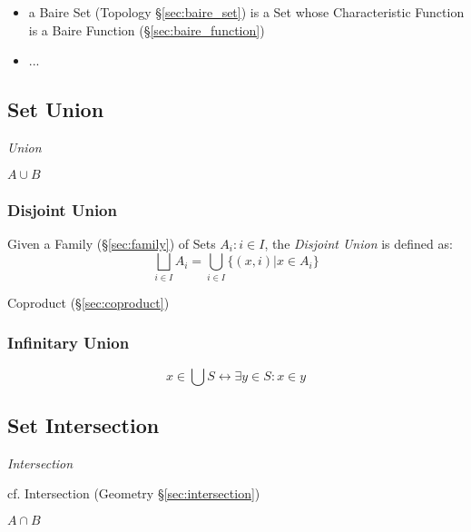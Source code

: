 \begin{itemize}
  \item a Baire Set (Topology \S\ref{sec:baire_set}) is a Set whose
    Characteristic Function is a Baire Function (\S\ref{sec:baire_function})
  \item ...
\end{itemize}



\subsection{Set Union}\label{sec:set_union}

\emph{Union}

$A \cup B$



\subsubsection{Disjoint Union}\label{sec:disjoint_union}

Given a Family (\S\ref{sec:family}) of Sets ${A_i : i \in I}$,
the \emph{Disjoint Union} is defined as:
\[
  \bigsqcup_{i \in I} A_i = \bigcup_{i \in I} \{(x,i) | x \in A_i \}
\]

Coproduct (\S\ref{sec:coproduct})



\subsubsection{Infinitary Union}\label{sec:infinitary_union}

\[
  x \in \bigcup S \leftrightarrow \exists y \in S : x \in y
\]



\subsection{Set Intersection}\label{sec:set_intersection}

\emph{Intersection}

\fist cf. Intersection (Geometry \S\ref{sec:intersection})

$A \cap B$



